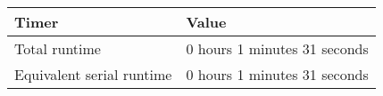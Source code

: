 \begin{tabular}{|l|l|}
\hline
Timer & Value\\
\hline
\hline
Total runtime & 0 hours 1 minutes 31 seconds\\
\hline
Equivalent serial runtime & 0 hours 1 minutes 31 seconds\\
\hline
\end{tabular}